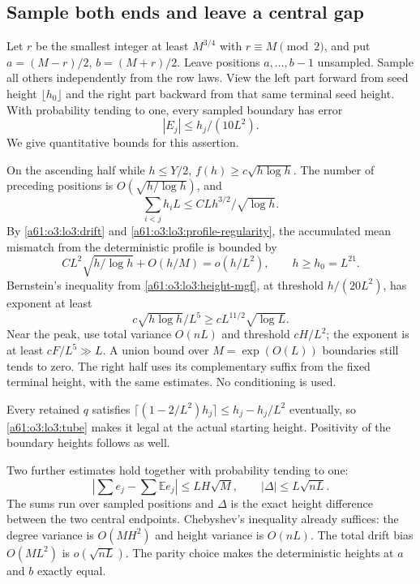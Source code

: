 \documentclass[11pt,letterpaper]{article}
\numberwithin{equation}{section}
\theoremstyle{remark}\newtheorem{remark}[theorem]{Remark}
\begin{document}
\subsection{Sample both ends and leave a central gap}

Let $r$ be the smallest integer at least $M^{3/4}$ with $r\equiv M\pmod 2$, and put
$a=(M-r)/2$, $b=(M+r)/2$. Leave positions $a,\ldots,b-1$ unsampled.
Sample all others independently from the row laws. View the left
part forward from seed height $\lfloor h_0\rfloor$ and the right
part backward from that same terminal seed height. With probability
tending to one, every sampled boundary has error
\begin{equation}\label{a61:o3:lo3:tube}
 |E_j|\le h_j/(10L^2).
\end{equation}
We give quantitative bounds for this assertion.

On the ascending half while $h\le Y/2$,
$f(h)\ge c\sqrt{h\log h}$. The number of preceding positions is
$O(\sqrt{h/\log h})$, and
\[
 \sum_{i<j}h_iL\le CLh^{3/2}/\sqrt{\log h}.
\]
By \eqref{a61:o3:lo3:drift} and \eqref{a61:o3:lo3:profile-regularity}, the
accumulated mean mismatch from the deterministic profile is bounded by
\[
 CL^2\sqrt{h/\log h}+O(h/M)=o(h/L^2),
 \qquad h\ge h_0=L^{21}.
\]
Bernstein's inequality from \eqref{a61:o3:lo3:height-mgf}, at threshold
$h/(20L^2)$, has exponent at least
\[
 c\sqrt{h\log h}/L^5
     \ge cL^{11/2}\sqrt{\log L}.
\]
Near the peak, use total variance $O(nL)$ and threshold $cH/L^2$;
the exponent is at least $cF/L^5\gg L$. A union bound over
$M=\exp(O(L))$ boundaries still tends to zero. The right half uses
its complementary suffix from the fixed terminal height, with the
same estimates. No conditioning is used.

Every retained $q$ satisfies
$\lceil(1-2/L^2)h_j\rceil\le h_j-h_j/L^2$ eventually, so
\eqref{a61:o3:lo3:tube} makes it legal at the actual starting height.
Positivity of the boundary heights follows as well.

Two further estimates hold together with probability tending to one:
\begin{equation}\label{a61:o3:lo3:repair-fluctuations}
 \left|\sum e_j-\sum\mathbb Ee_j\right|\le LH\sqrt M,
 \qquad |\Delta|\le L\sqrt{nL}.
\end{equation}
The sums run over sampled positions and $\Delta$ is the exact height
difference between the two central endpoints. Chebyshev's inequality
already suffices: the degree variance is $O(MH^2)$ and height variance
is $O(nL)$. The total drift bias $O(ML^2)$ is $o(\sqrt{nL})$.
The parity choice makes the deterministic heights at $a$ and $b$
exactly equal.
\end{document}
